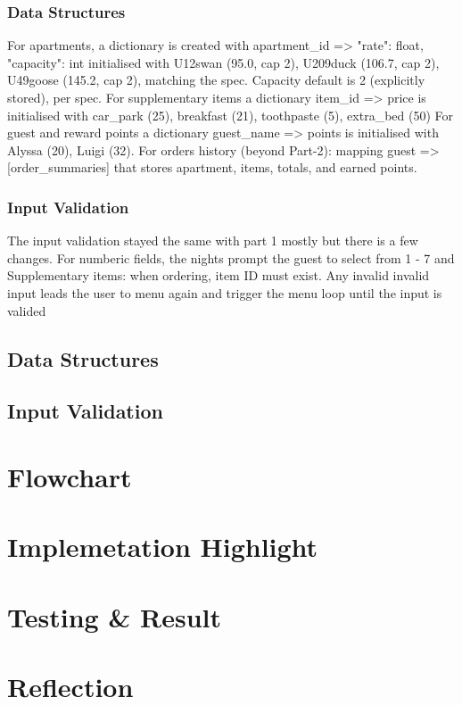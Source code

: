 \documentclass[conference]{IEEEtran}
\begin{document}
\subsubsection{Data Structures}
For apartments, a dictionary is created with apartment\_id => {"rate": float, "capacity": int} initialised with U12swan (95.0, cap 2), U209duck (106.7, cap 2), U49goose (145.2, cap 2), matching the spec. Capacity default is 2 (explicitly stored), per spec.
For supplementary items a dictionary item\_id => price is initialised with car\_park (25), breakfast (21), toothpaste (5), extra\_bed (50)
For guest and reward points a dictionary guest\_name => points is initialised  with Alyssa (20), Luigi (32).
For orders history (beyond Part-2): mapping guest => [order\_summaries] that stores apartment, items, totals, and earned points.

\subsubsection{Input Validation}
The input validation stayed the same with part 1 mostly but there is a few changes. For numberic fields, the nights prompt the guest to select from 1 - 7 and Supplementary items: when ordering, item ID must exist. Any invalid invalid input leads the user to menu again and trigger the menu loop until the input is valided
\subsection{Data Structures}

\subsection{Input Validation}

\section{Flowchart}

\section{Implemetation Highlight}

\section{Testing \& Result}

\section{Reflection}
\end{document}
